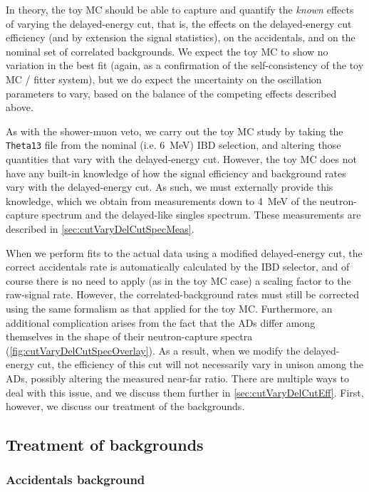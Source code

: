 \documentclass[../thesis.tex]{subfiles}
\begin{document}
In theory, the toy MC should be able to capture and quantify the \emph{known} effects of varying the delayed-energy cut, that is, the effects on the delayed-energy cut efficiency (and by extension the signal statistics), on the accidentals, and on the nominal set of correlated backgrounds. We expect the toy MC to show no variation in the best fit (again, as a confirmation of the self-consistency of the toy MC / fitter system), but we do expect the uncertainty on the oscillation parameters to vary, based on the balance of the competing effects described above.

As with the shower-muon veto, we carry out the toy MC study by taking the \texttt{Theta13} file from the nominal (i.e. 6~MeV) IBD selection, and altering those quantities that vary with the delayed-energy cut. However, the toy MC does not have any built-in knowledge of how the signal efficiency and background rates vary with the delayed-energy cut. As such, we must externally provide this knowledge, which we obtain from measurements down to 4~MeV of the neutron-capture spectrum and the delayed-like singles spectrum. These measurements are described in \autoref{sec:cutVaryDelCutSpecMeas}.

When we perform fits to the actual data using a modified delayed-energy cut, the correct accidentals rate is automatically calculated by the IBD selector, and of course there is no need to apply (as in the toy MC case) a scaling factor to the raw-signal rate. However, the correlated-background rates must still be corrected using the same formalism as that applied for the toy MC\@.  Furthermore, an additional complication arises from the fact that the ADs differ among themselves in the shape of their neutron-capture spectra (\autoref{fig:cutVaryDelCutSpecOverlay}). As a result, when we modify the delayed-energy cut, the efficiency of this cut will not necessarily vary in unison among the ADs, possibly altering the measured near-far ratio. There are multiple ways to deal with this issue, and we discuss them further in \autoref{sec:cutVaryDelCutEff}. First, however, we discuss our treatment of the backgrounds.

\subsection{Treatment of backgrounds}
\label{sec:cutVaryDelayedCutBkgTreatment}

\subsubsection{Accidentals background}
\end{document}
